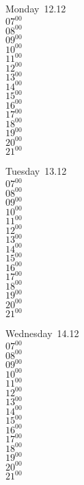 \documentclass[11pt,a4paper]{book}\usepackage[]{graphicx}\usepackage[]{color}
\begin{document}
\begin{headerbox}
\end{headerbox}
\begin{weekdaybox}
  Monday~12.12\\
  { 
  \vfill
  $07^{00}$\\
$08^{00}$\\
$09^{00}$\\
$10^{00}$\\
$11^{00}$\\
$12^{00}$\\
$13^{00}$\\
$14^{00}$\\
$15^{00}$\\
$16^{00}$\\
$17^{00}$\\
$18^{00}$\\
$19^{00}$\\
$20^{00}$\\
$21^{00}$\\
  }
\end{weekdaybox}
\begin{weekdaybox}
  Tuesday~13.12\\
  { 
  \vfill
  $07^{00}$\\
$08^{00}$\\
$09^{00}$\\
$10^{00}$\\
$11^{00}$\\
$12^{00}$\\
$13^{00}$\\
$14^{00}$\\
$15^{00}$\\
$16^{00}$\\
$17^{00}$\\
$18^{00}$\\
$19^{00}$\\
$20^{00}$\\
$21^{00}$\\
  }
\end{weekdaybox}
\begin{weekdaybox}
  Wednesday~14.12\\
  { 
  \vfill
  $07^{00}$\\
$08^{00}$\\
$09^{00}$\\
$10^{00}$\\
$11^{00}$\\
$12^{00}$\\
$13^{00}$\\
$14^{00}$\\
$15^{00}$\\
$16^{00}$\\
$17^{00}$\\
$18^{00}$\\
$19^{00}$\\
$20^{00}$\\
$21^{00}$\\
  }
\end{weekdaybox}
\end{document}
